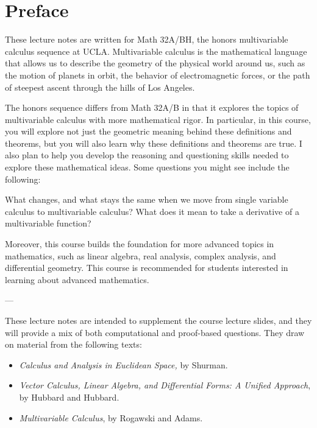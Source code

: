 \documentclass{wongtreebook}
\begin{document}
\chapter{Preface}
These lecture notes are written for Math 32A/BH, the honors multivariable calculus sequence at UCLA.  Multivariable calculus is the mathematical language that allows us to describe the geometry of the physical world around us, such as the motion of planets in orbit, the behavior of electromagnetic forces, or the path of steepest ascent through the hills of Los Angeles. 

The honors sequence differs from Math 32A/B in that it explores the topics of multivariable calculus with more mathematical rigor.  In particular, in this course, you will explore not just the geometric meaning behind these definitions and theorems, but you will also learn why these definitions and theorems are true.  I also plan to help you develop the reasoning and questioning skills needed to explore these mathematical ideas.  Some questions you might see include the following:

\begin{motivating}
What changes, and what stays the same when we move from single variable calculus to multivariable calculus?  What does it mean to take a derivative of a multivariable function?
\end{motivating}


Moreover, this course builds the foundation for more advanced topics in mathematics, such as linear algebra, real analysis, complex analysis, and differential geometry.  This course is recommended for students interested in learning about advanced mathematics. 

\begin{center}
    ---
\end{center}

These lecture notes are intended to supplement the course lecture slides, and they will provide a mix of both computational and proof-based questions.  They draw on material from the following texts:
\begin{itemize}
    \item \textit{Calculus and Analysis in Euclidean Space,} by Shurman.
    \item \textit{Vector Calculus, Linear Algebra, and Differential Forms: A Unified Approach}, by Hubbard and Hubbard.
    \item \textit{Multivariable Calculus}, by Rogawski and Adams.
\end{itemize}
\end{document}
